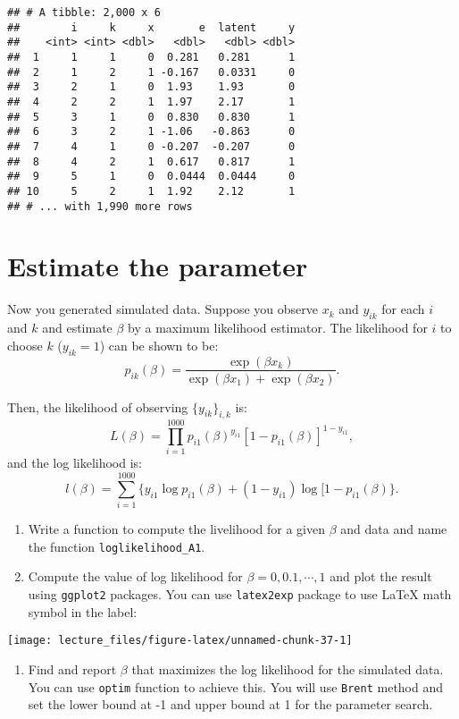 \documentclass[
]{book}
\providecommand{\tightlist}{%
  \setlength{\itemsep}{0pt}\setlength{\parskip}{0pt}}
\begin{document}
\begin{verbatim}
## # A tibble: 2,000 x 6
##        i     k     x       e  latent     y
##    <int> <int> <dbl>   <dbl>   <dbl> <dbl>
##  1     1     1     0  0.281   0.281      1
##  2     1     2     1 -0.167   0.0331     0
##  3     2     1     0  1.93    1.93       0
##  4     2     2     1  1.97    2.17       1
##  5     3     1     0  0.830   0.830      1
##  6     3     2     1 -1.06   -0.863      0
##  7     4     1     0 -0.207  -0.207      0
##  8     4     2     1  0.617   0.817      1
##  9     5     1     0  0.0444  0.0444     0
## 10     5     2     1  1.92    2.12       1
## # ... with 1,990 more rows
\end{verbatim}

\hypertarget{estimate-the-parameter}{%
\section{Estimate the parameter}\label{estimate-the-parameter}}

Now you generated simulated data. Suppose you observe \(x_k\) and \(y_{ik}\) for each \(i\) and \(k\) and estimate \(\beta\) by a maximum likelihood estimator. The likelihood for \(i\) to choose \(k\) (\(y_{ik} = 1\)) can be shown to be:
\[
p_{ik}(\beta) = \frac{\exp(\beta x_k)}{\exp(\beta x_1) + \exp(\beta x_2)}.
\]

Then, the likelihood of observing \(\{y_{ik}\}_{i, k}\) is:
\[
L(\beta) = \prod_{i = 1}^{1000} p_{i1}(\beta)^{y_{i1}} [1 - p_{i1}(\beta)]^{1 - y_{i1}},
\]
and the log likelihood is:
\[
l(\beta) = \sum_{i = 1}^{1000}\{y_{i1}\log p_{i1}(\beta) + (1 - y_{i1})\log [1 - p_{i1}(\beta)\}.
\]

\begin{enumerate}
\def\labelenumi{\arabic{enumi}.}
\item
  Write a function to compute the livelihood for a given \(\beta\) and data and name the function \texttt{loglikelihood\_A1}.
\item
  Compute the value of log likelihood for \(\beta = 0, 0.1, \cdots, 1\) and plot the result using \texttt{ggplot2} packages. You can use \texttt{latex2exp} package to use LaTeX math symbol in the label:
\end{enumerate}

\begin{center}\texttt{[image: lecture\_files/figure-latex/unnamed-chunk-37-1]} \end{center}

\begin{enumerate}
\def\labelenumi{\arabic{enumi}.}
\tightlist
\item
  Find and report \(\beta\) that maximizes the log likelihood for the simulated data. You can use \texttt{optim} function to achieve this. You will use \texttt{Brent} method and set the lower bound at -1 and upper bound at 1 for the parameter search.
\end{enumerate}
\end{document}
